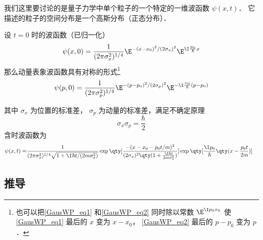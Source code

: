 
\begin{issues}
\issueAbstract
\issueTODO
\end{issues}



我们这里要讨论的是量子力学中单个粒子的一个特定的一维波函数 $\psi(x,t)$． 它描述的粒子的空间分布是一个高斯分布（正态分布）．

设 $t = 0$ 时的波函数（已归一化）
\begin{equation}\label{GausWP_eq1}
\psi (x,0) = \frac{1}{(2\pi\sigma_x ^2)^{1/4}} \E^{-(x - x_0)^2/(2\sigma_x)^2} \E^{\I \frac{p_0}{\hbar}x}
\end{equation}
那么动量表象波函数具有对称的形式\footnote{也可以把\autoref{GausWP_eq1} 和\autoref{GausWP_eq2} 同时除以常数 $\E^{\I p_0 x_0}$ 使\autoref{GausWP_eq1} 最后的 $x$ 变为 $x-x_0$， \autoref{GausWP_eq2} 最后的 $p-p_0$ 变为 $p$． }%
\begin{equation}\label{GausWP_eq2} %
\psi (p,0) = \frac{1}{(2\pi\sigma_p^2)^{1/4}} \E^{-(p - p_0)^2/(2\sigma_p)^2} \E^{-\I\frac{x_0}{\hbar }(p - p_0)}
\end{equation}

其中 $\sigma_x$ 为位置的标准差， $\sigma_p$ 为动量的标准差，满足不确定原理
\begin{equation} %
\sigma_x\sigma_p = \frac{\hbar}{2}
\end{equation}
含时波函数为
\begin{equation}\label{GausWP_eq4}\begin{aligned} %
\psi (x,t) = &\frac{1}{(2\pi\sigma_x^2)^{1/4} \sqrt{1 + {\I\hbar t}/(2m \sigma_x^2)}}
\exp\qty[\frac{-(x - x_0 - p_0 t/m)^2}{(2\sigma_x )^2 \qty(1 + \frac{\I\hbar t}{2m \sigma_x^2})}] \exp\qty[\frac{\I p_0}{\hbar } \qty(x - \frac{p_0 t}{2m})]
\end{aligned}\end{equation}

\subsection{推导}
